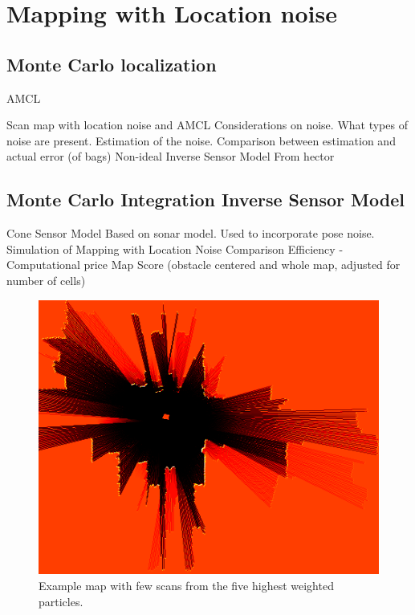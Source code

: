 \section{Mapping with Location noise}

\subsection{Monte Carlo localization}

AMCL

Scan map with location noise and AMCL
Considerations on noise. What types of noise are present. Estimation of the noise. Comparison between estimation and actual error (of bags) 
Non-ideal Inverse Sensor Model
From hector

\subsection{Monte Carlo Integration Inverse Sensor Model}

\cite{monteCarloIntegration}

Cone Sensor Model
Based on sonar model. Used to incorporate pose noise. 
Simulation of Mapping with Location Noise
Comparison
Efficiency - Computational price
Map Score (obstacle centered and whole map, adjusted for number of cells)
\begin{figure}
	\centering
	\includegraphics[width=0.7\linewidth]{figures/static_mapping/particle_sensor}
	\caption{Example map with few scans from the five highest weighted particles.}
	\label{fig:particle_sensor}
\end{figure}

